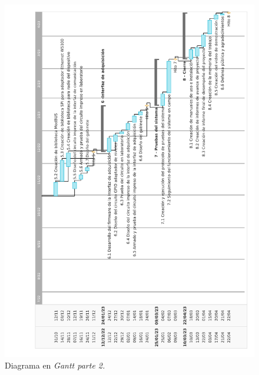 \documentclass[
11pt%
]{charter}
\begin{document}
\begin{figure}[htpb]
\centering 
\includegraphics[width=1\textwidth]{./Figuras/gantt_A5_2_ed2.pdf}
\caption{Diagrama en \textit{Gantt parte 2.}}
\label{fig:gantt3}
\end{figure}



\end{document}
